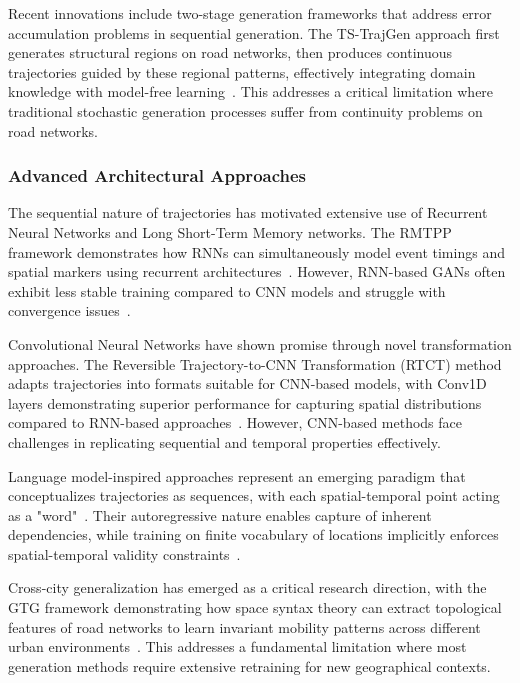 \documentclass[runningheads]{llncs}
\begin{document}
Recent innovations include two-stage generation frameworks that address error accumulation problems in sequential generation. The TS-TrajGen approach first generates structural regions on road networks, then produces continuous trajectories guided by these regional patterns, effectively integrating domain knowledge with model-free learning~\cite{jiang2023continuous}. This addresses a critical limitation where traditional stochastic generation processes suffer from continuity problems on road networks.

\subsubsection{Advanced Architectural Approaches}

The sequential nature of trajectories has motivated extensive use of Recurrent Neural Networks and Long Short-Term Memory networks. The RMTPP framework demonstrates how RNNs can simultaneously model event timings and spatial markers using recurrent architectures~\cite{du2016recurrent}. However, RNN-based GANs often exhibit less stable training compared to CNN models and struggle with convergence issues~\cite{merhi2024synthetic}.

Convolutional Neural Networks have shown promise through novel transformation approaches. The Reversible Trajectory-to-CNN Transformation (RTCT) method adapts trajectories into formats suitable for CNN-based models, with Conv1D layers demonstrating superior performance for capturing spatial distributions compared to RNN-based approaches~\cite{merhi2024synthetic}. However, CNN-based methods face challenges in replicating sequential and temporal properties effectively.

Language model-inspired approaches represent an emerging paradigm that conceptualizes trajectories as sequences, with each spatial-temporal point acting as a "word"~\cite{zhang2025end}. Their autoregressive nature enables capture of inherent dependencies, while training on finite vocabulary of locations implicitly enforces spatial-temporal validity constraints~\cite{kong2023mobility}.

Cross-city generalization has emerged as a critical research direction, with the GTG framework demonstrating how space syntax theory can extract topological features of road networks to learn invariant mobility patterns across different urban environments~\cite{wang2025gtg}. This addresses a fundamental limitation where most generation methods require extensive retraining for new geographical contexts.
\end{document}
